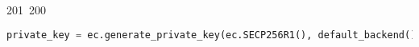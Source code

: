 201~200~\documentclass{article}
\begin{document}
\begin{lstlisting}[language=Python, caption=Key Pair Generation]
	                                                                                                                                                                                                                                                                                                	                                                                                                                                        	    	                                                                                                	                                                                                                                                                                                                                                                                                                                                	                                                                        	                                                                        	                                                                                                                                        	                                                                                                                                                                                        private_key = ec.generate_private_key(ec.SECP256R1(), default_backend())
	                                                                                                                                                                                                                                                                                                	                                                                                                                                        	    	                                                                                                	                                                                                                                                                                                                                                                                                                                                	                                                                        	                                                                        	                                                                                                                                        	                                                                                                                                                                                            public_key = private_key.public_key()

\end{lstlisting}
\end{document}
